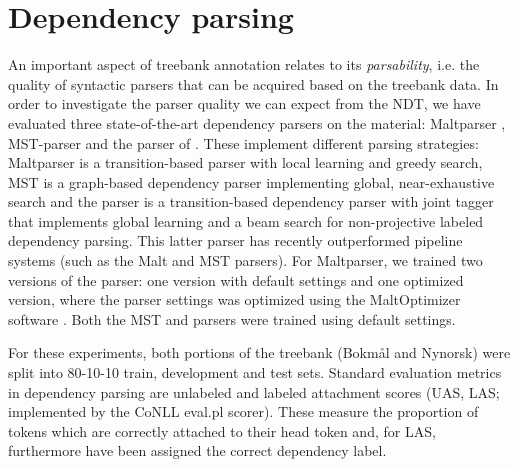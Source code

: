 \documentclass[11pt,a4paper]{article}
\begin{document}
\section{Dependency parsing}
An important aspect of treebank annotation relates to its \emph{parsability},
i.e. the quality of syntactic parsers that can be acquired based on
the treebank data.  In order to investigate the parser quality we can
expect from the NDT, we have evaluated three state-of-the-art dependency
parsers on the material: Maltparser ,
MST-parser  and the parser of
. These implement different parsing strategies: Maltparser is a transition-based parser with local learning and greedy search, MST is a graph-based dependency parser implementing global, near-exhaustive search and the  parser is a transition-based dependency parser with joint tagger that
implements global learning and a beam search for non-projective labeled
dependency parsing. 
This latter parser has recently outperformed pipeline systems (such as the
Malt and MST parsers).
For Maltparser, we trained two versions of the
parser: one version with default settings and one optimized version,
where the parser settings was optimized using the MaltOptimizer
software . Both the MST and 
parsers were trained using default settings.

For these experiments, both portions of the treebank (Bokm{\aa}l and
Nynorsk) were split into 80-10-10 train, development and test sets.
Standard evaluation metrics in dependency parsing are unlabeled and
labeled attachment scores (UAS, LAS; implemented by the CoNLL
\textsf{eval.pl} scorer).  These measure the proportion of tokens
which are correctly attached to their head token and, for LAS,
furthermore have been assigned the correct dependency label.




\end{document}
